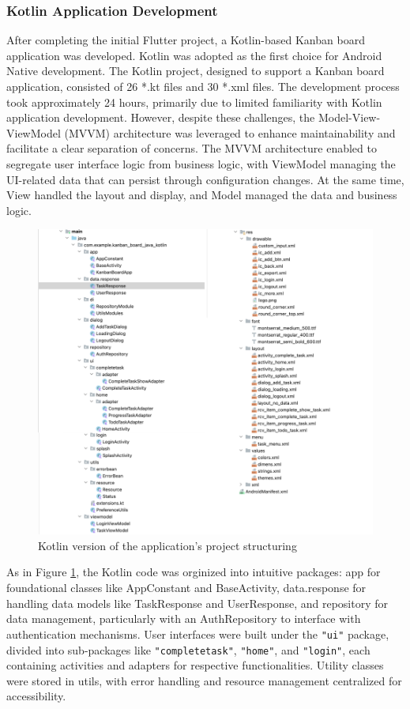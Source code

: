 \subsubsection{Kotlin Application Development} 
After completing the initial Flutter project, a Kotlin-based Kanban board application was developed. Kotlin was adopted as the first choice for Android Native development. The Kotlin project, designed to support a Kanban board application, consisted of 26 *.kt files and 30 *.xml files. The development process took approximately 24 hours, primarily due to limited familiarity with Kotlin application development.
However, despite these challenges, the Model-View-ViewModel (MVVM) architecture was leveraged to enhance maintainability and facilitate a clear separation of concerns. The MVVM \cite{Sewak_2023} architecture enabled to segregate user interface logic from business logic, with ViewModel managing the UI-related data that can persist through configuration changes. At the same time, View handled the layout and display, and Model managed the data and business logic.
\begin{figure}[htbp]
    \centering
    \includegraphics[scale = 0.8]{img/kotlin_project_struct.png}
    \caption{Kotlin version of the application’s project structuring}
    \label{fig:kotlin_project_struct}
\end{figure}
\par
As in Figure \ref*{fig:kotlin_project_struct}, the Kotlin code was orginized into intuitive packages: app for foundational classes like AppConstant and BaseActivity, data.response for handling data models like TaskResponse and UserResponse, and repository for data management, particularly with an AuthRepository to interface with authentication mechanisms. User interfaces were built under the \verb|"ui"| package, divided into sub-packages like \verb|"completetask"|, \verb|"home"|, and \verb|"login"|, each containing activities and adapters for respective functionalities. Utility classes were stored in utils, with error handling and resource management centralized for accessibility.
